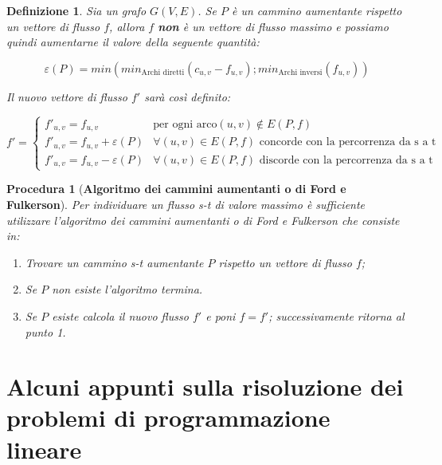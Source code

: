 \documentclass[10pt,a4paper,titlepage]{article}
\theoremstyle{break}
\newtheorem{myDef}{Definizione}
\theoremstyle{break}
\newtheorem{myProced}{Procedura}
\theoremstyle{break}
\begin{document}
\begin{myDef}
Sia un grafo $G(V,E)$. Se $P$ è un \textit{cammino aumentante} rispetto un vettore di flusso $f$, allora $f$ \textbf{non} è un vettore di flusso massimo e possiamo quindi aumentarne il valore della seguente quantità:

\begin{equation}
\varepsilon(P) = min(min_{\text{Archi diretti}}(c_{u,v} - f_{u,v}); min_{\text{Archi inversi}}(f_{u,v}))
\end{equation}

Il nuovo vettore di flusso $f'$ sarà così definito:

\begin{equation}
f' = \left \lbrace
\begin{array}{lc}
        f'_{u,v} = f_{u,v} & \text{per ogni arco} (u,v) \notin E(P, f)   \\
        f'_{u,v} = f_{u,v} + \varepsilon(P) & \forall (u,v) \in E(P, f) \text{ concorde con la percorrenza da s a t} \\
        f'_{u,v} = f_{u,v} - \varepsilon(P) & \forall (u,v) \in E(P, f) \text{ discorde con la percorrenza da s a t}  
\end{array} \right.
\end{equation}


\end{myDef}

\begin{myProced}[\textbf{Algoritmo dei cammini aumentanti o di Ford e Fulkerson}]
Per individuare un flusso s-t di valore massimo è sufficiente utilizzare l'algoritmo dei cammini aumentanti o di Ford e Fulkerson che consiste in:

\begin{enumerate}
\item Trovare un cammino s-t aumentante $P$ rispetto un vettore di flusso $f$;
\item Se $P$ non esiste l'algoritmo termina.
\item Se $P$ esiste calcola il nuovo flusso $f'$ e poni $f = f'$; successivamente ritorna al punto 1.
\end{enumerate}


\end{myProced}



\newpage
\section{Alcuni appunti sulla risoluzione dei problemi di programmazione lineare}
\end{document}
